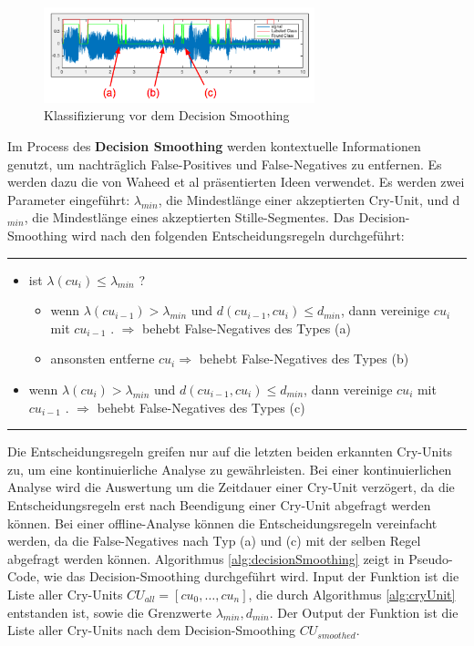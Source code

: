 \begin{figure}[h]
	\centering
	\includegraphics[width=0.7\textwidth]{bilder/smoothing02.png}
	\caption{Klassifizierung vor dem Decision Smoothing}
	\label{img:beforeSmoothing}
\end{figure}

Im Process des \textbf{Decision Smoothing} werden kontextuelle Informationen genutzt, um nachträglich False-Positives und False-Negatives zu entfernen. Es werden dazu die von Waheed et al \cite{vad_entropy} präsentierten Ideen verwendet. Es werden zwei Parameter eingeführt: $\lambda_{min}$, die Mindestlänge einer akzeptierten Cry-Unit, und d$_{min}$, die Mindestlänge eines akzeptierten Stille-Segmentes. Das Decision-Smoothing wird nach den folgenden Entscheidungsregeln durchgeführt:

\pagebreak
\noindent\rule{\linewidth}{0.3pt}
\begin{itemize}
	\item ist $\lambda (cu_{i}) \leq \lambda_{min}$ ?
	\begin{itemize}
		\item wenn $\lambda (cu_{i-1}) > \lambda_{min}$ und $d (cu_{i-1}, cu_{i}) \leq d_{min}$, dann vereinige $cu_{i}$ mit $cu_{i-1}$ . $\Longrightarrow$ behebt False-Negatives des Types (a)
		\item ansonsten entferne $cu_i \Longrightarrow$ behebt False-Negatives des Types (b)
	\end{itemize}
	\item wenn $\lambda (cu_{i}) > \lambda_{min}$ und $d (cu_{i-1}, cu_{i}) \leq d_{min}$, dann vereinige $cu_{i}$ mit $cu_{i-1}$ . $\Rightarrow$ behebt False-Negatives des Types (c)
\end{itemize}
\noindent\rule{\linewidth}{0.3pt}

Die Entscheidungsregeln greifen nur auf die letzten beiden erkannten Cry-Units zu, um eine kontinuierliche Analyse zu gewährleisten. Bei einer kontinuierlichen Analyse wird die Auswertung um die Zeitdauer einer Cry-Unit verzögert, da die Entscheidungsregeln erst nach Beendigung einer Cry-Unit abgefragt werden können. Bei einer offline-Analyse können die Entscheidungsregeln vereinfacht werden, da die False-Negatives nach Typ (a) und (c) mit der selben Regel abgefragt werden können. Algorithmus \ref{alg:decisionSmoothing} zeigt in Pseudo-Code, wie das Decision-Smoothing durchgeführt wird. Input der Funktion ist die Liste aller Cry-Units $CU_{all} = [cu_0 , \ldots , cu_n]$, die durch Algorithmus \ref{alg:cryUnit} entstanden ist, sowie die Grenzwerte $\lambda_{min}, d_{min}$. Der Output der Funktion ist die Liste aller Cry-Units nach dem Decision-Smoothing $CU_{smoothed}$.

